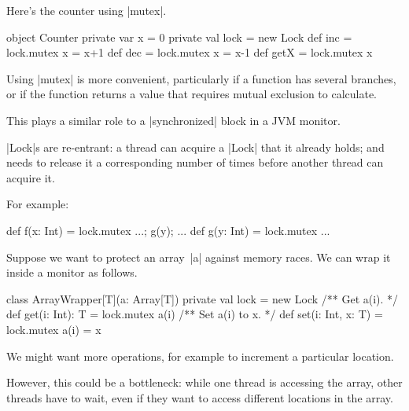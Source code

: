 \documentclass[notes,color]{sepslide0}
\begin{document}

\begin{slide}

Here's the counter using |mutex|.
%
\begin{scala}
object Counter{
  private var x = 0
  private val lock = new Lock
  def inc = lock.mutex{ x = x+1 }
  def dec = lock.mutex{ x = x-1 }
  def getX = lock.mutex{ x }
}
\end{scala}
%
Using |mutex| is more convenient, particularly if a function has several
branches, or if the function returns a value that requires mutual exclusion to
calculate. 

This plays a similar role to a |synchronized| block in a JVM monitor.
\end{slide}


\begin{slide}

|Lock|s are re-entrant: a thread can acquire a |Lock| that it already holds;
and needs to release it a corresponding number of times before another
thread can acquire it.

For example:
\begin{scala}
def f(x: Int) = lock.mutex{ ...; g(y); ... }
def g(y: Int) = lock.mutex{ ... }
\end{scala}
\end{slide}



\begin{slide}

Suppose we want to protect an array~|a| against memory races.  We can wrap it
inside a monitor as follows.
%
\begin{scala}
class ArrayWrapper[T](a: Array[T]){
  private val lock = new Lock
  /** Get a(i). */
  def get(i: Int): T = lock.mutex{ a(i) }
  /** Set a(i) to x. */
  def set(i: Int, x: T) = lock.mutex{ a(i) = x }
}
\end{scala}
%
We might want more operations, for example to increment a particular
location. 

However, this could be a bottleneck: while one thread is accessing
the array, other threads have to wait, even if they want to access 
different locations in the array.
\end{slide}

\end{document}
